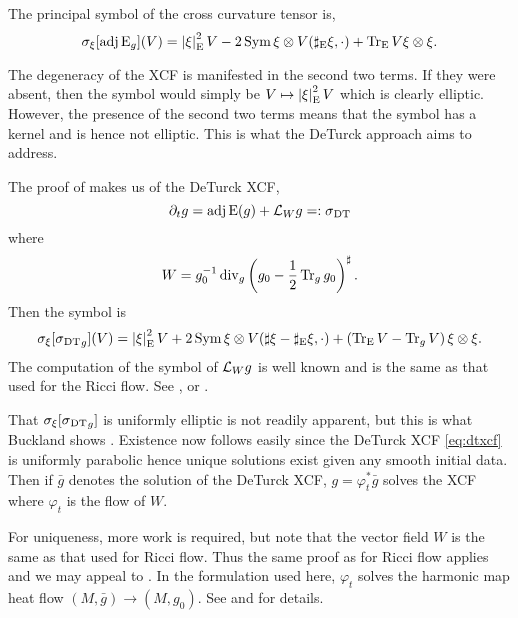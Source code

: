 \documentclass[a4paper,12pt]{amsart}
\begin{document}
\begin{lemma}
\label{lem:xcf_symbol}
The principal symbol of the cross curvature tensor is,
\[
\sigma_{\xi} [\operatorname{adj}\operatorname{E}_g] (V) = \left\lvert{\xi}\right\rvert^2_{\operatorname{E}}V - 2 \operatorname{Sym} \xi \otimes V(\sharp_{\operatorname{E}}\xi, \cdot) + \operatorname{Tr}_{\operatorname{E}} V \xi \otimes \xi.
\]
\end{lemma}

The degeneracy of the XCF is manifested in the second two terms. If they were absent, then the symbol would simply be \(V \mapsto \left\lvert{\xi}\right\rvert^2_{\operatorname{E}} V\) which is clearly elliptic. However, the presence of the second two terms means that the symbol has a kernel and is hence not elliptic. This is what the DeTurck approach aims to address.

The proof of  makes us of the DeTurck XCF,
\begin{equation}
\label{eq:dtxcf}
\partial_t g = \operatorname{adj}\operatorname{E} (g) + \mathcal{L}_W g =: \operatorname{\operatorname{\sigma}_{\operatorname{DT}}}
\end{equation}
where
\[
W = g_0^{-1} \operatorname{div}_g \left(g_0 - \frac{1}{2}\operatorname{Tr}_g g_0\right)^{\sharp}.
\]
Then the symbol is
\begin{equation}
\label{eq:dtxcf_symbol}
\sigma_{\xi} [\operatorname{\operatorname{\sigma}_{\operatorname{DT}}}_g] (V) = \left\lvert{\xi}\right\rvert^2_{\operatorname{E}}V + 2 \operatorname{Sym} \xi \otimes V(\sharp \xi - \sharp_{\operatorname{E}}\xi, \cdot) + \left(\operatorname{Tr}_{\operatorname{E}} V - \operatorname{Tr}_g V\right) \xi \otimes \xi.
\end{equation}
The computation of the symbol of \(\mathcal{L}_W g\) is well known and is the same as that used for the Ricci flow. See \cite{MR2207496}, \cite[Sections 3.3, 3.4]{MR2061425} or \cite[Chapter 5]{MR2265040}.

That \(\sigma_{\xi}[\operatorname{\operatorname{\sigma}_{\operatorname{DT}}}_g]\) is uniformly elliptic is not readily apparent, but this is what Buckland shows \cite{MR2207496}. Existence now follows easily since the DeTurck XCF \eqref{eq:dtxcf} is uniformly parabolic hence unique solutions exist given any smooth initial data. Then if \(\bar{g}\) denotes the solution of the DeTurck XCF, \(g = \varphi_t^{\ast} \bar{g}\) solves the XCF where \(\varphi_t\) is the flow of \(W\).

For uniqueness, more work is required, but note that the vector field \(W\) is the same as that used for Ricci flow. Thus the same proof as for Ricci flow applies and we may appeal to \cite[Section 6]{MR1375255}. In the formulation used here, \(\varphi_t\) solves the harmonic map heat flow \((M, \bar{g}) \to (M, g_0)\). See \cite[Section 5.2]{MR2265040} and \cite[Sections 3.3, 3.4]{MR2061425} for details.
\end{document}
